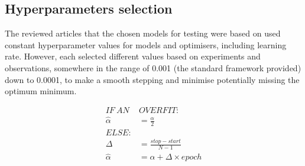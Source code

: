 \subsection{Hyperparameters selection} \label{subsec:l-rate}
%
The reviewed articles that the chosen models for testing were based on used constant hyperparameter values for models and optimisers, including learning rate.
However, each selected different values based on experiments and observations, somewhere in the range of 0.001 (the standard framework provided) down to 0.0001, to make a smooth stepping and minimise potentially missing the optimum minimum.

%
\begin{equation}
  \begin{split}
      IF \ AN \ & OVERFIT: \\
      \hat{\alpha} &= \frac{\alpha }{2} \\
      ELSE: & \\
      \Delta &= \frac{stop - start}{N-1} \\
      \hat{\alpha} &= \alpha + \Delta \times epoch \\
      \label{eq:scheduler}
  \end{split}
\end{equation}
